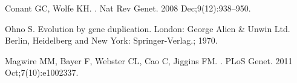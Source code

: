 


  \vspace*{0.2in}
  \begin{flushleft}
    
    
  \end{flushleft}
  

  \linenumbers

  
  
  
  
  
  
  
  

  \nolinenumbers


  \begin{thebibliography}{10}
    Conant GC, Wolfe KH.
    .
    \newblock Nat Rev Genet. 2008 Dec;9(12):938--950.

    Ohno S.
    \newblock Evolution by gene duplication.
    \newblock London: George Alien \& Unwin Ltd. Berlin, Heidelberg and New York:
      Springer-Verlag.; 1970.

    Magwire MM, Bayer F, Webster CL, Cao C, Jiggins FM.
    .
    \newblock PLoS Genet. 2011 Oct;7(10):e1002337.

  \end{thebibliography}

